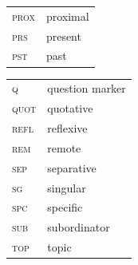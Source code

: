 \documentclass[output=paper]{langsci/langscibook}
\begin{document}
\begin{tabularx}{.45\textwidth}{lQ}
\textsc{	prox	}	&	proximal	\\
\textsc{	prs	}	&	present	\\
\textsc{	pst	}	&	past	\\
\end{tabularx}
\begin{tabularx}{.45\textwidth}{lQ}
\textsc{	q	}	&	question marker	\\
\textsc{	quot	}	&	quotative	\\
\textsc{	refl	}	&	reflexive	\\
\textsc{	rem	}	&	remote	\\
\textsc{	sep	}	&	separative	\\
\textsc{	sg	}	&	singular	\\
\textsc{	spc	}	&	specific	\\
\textsc{	sub	}	&	subordinator	\\
\textsc{	top	}	&	topic	\\
\end{tabularx}



\sloppy
\printbibliography[heading=subbibliography,notkeyword=this] 
\end{document}
